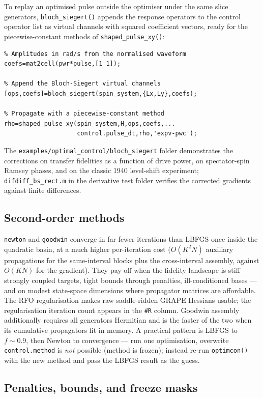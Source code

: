 \documentclass[11pt,a4paper]{article}
\newcommand{\code}[1]{\texttt{#1}}
\begin{document}
To replay an optimised pulse outside the optimiser under the same slice
generators, \code{bloch\_siegert()} appends the response operators to
the control operator list as virtual channels with squared coefficient
vectors, ready for the piecewise-constant methods of
\code{shaped\_pulse\_xy()}:

\begin{lstlisting}
% Amplitudes in rad/s from the normalised waveform
coefs=mat2cell(pwr*pulse,[1 1]);

% Append the Bloch-Siegert virtual channels
[ops,coefs]=bloch_siegert(spin_system,{Lx,Ly},coefs);

% Propagate with a piecewise-constant method
rho=shaped_pulse_xy(spin_system,H,ops,coefs,...
                    control.pulse_dt,rho,'expv-pwc');
\end{lstlisting}

The \code{examples/optimal\_control/bloch\_siegert} folder demonstrates
the corrections on transfer fidelities as a function of drive power, on
spectator-spin Ramsey phases, and on the classic 1940 level-shift
experiment; \code{difdiff\_bs\_rect.m} in the derivative test folder
verifies the corrected gradients against finite differences.

\subsection{Second-order methods}

\code{newton} and \code{goodwin} converge in far fewer iterations than
LBFGS once inside the quadratic basin, at a much higher per-iteration
cost ($O(K^2N)$ auxiliary propagations for the same-interval blocks plus
the cross-interval assembly, against $O(KN)$ for the gradient). They pay
off when the fidelity landscape is stiff --- strongly coupled targets,
tight bounds through penalties, ill-conditioned bases --- and on modest
state-space dimensions where propagator matrices are affordable. The RFO
regularisation makes raw saddle-ridden GRAPE Hessians usable; the
regularisation iteration count appears in the \code{\#R} column. Goodwin
assembly additionally requires all generators Hermitian and is the
faster of the two when its cumulative propagators fit in memory. A
practical pattern is LBFGS to $f\sim0.9$, then Newton to convergence ---
run one optimisation, overwrite \code{control.method} is \emph{not}
possible (method is frozen); instead re-run \code{optimcon()} with the
new method and pass the LBFGS result as the guess.

\subsection{Penalties, bounds, and freeze masks}
\end{document}
